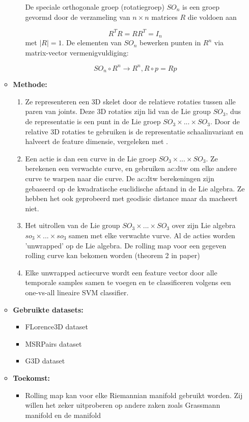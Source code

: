 \begin{itemize}
\begin{itemize}
\begin{itemize}
			De speciale orthogonale groep (rotatiegroep) $SO_n$ is een groep gevormd door de verzameling van $n \times n$ matrices $R$ die voldoen aan
			
			$$R^TR = RR^T = I_n$$
			met $|R| = 1$. De elementen van $SO_n$ bewerken punten in $R^n$ via matrix-vector vermenigvuldiging:
			
			$$SO_n \circ R^n \rightarrow R^n, R \circ p = Rp$$
		\end{itemize}
		\item \textbf{Methode:} 
		\begin{enumerate}
			\item Ze representeren een 3D skelet door de relatieve rotaties tussen alle paren van joints. Deze 3D rotaties zijn lid van de Lie group $SO_3$, dus de representatie is een punt in de Lie groep $SO_3 \times ... \times SO_3$. Door de relative 3D rotaties te gebruiken is de representatie schaalinvariant en halveert de feature dimensie, vergeleken met \cite{Vemulapalli2014}.
			\item Een actie is dan een curve in de Lie groep $SO_3 \times ... \times SO_3$. Ze berekenen een verwachte curve, en gebruiken \gls{ac:dtw} om elke andere curve te warpen naar die curve. De \gls{ac:dtw} berekeningen zijn gebaseerd op de kwadratische euclidische afstand in de Lie algebra. Ze hebben het ook geprobeerd met geodisic distance maar da macheert niet. 
			\item Het uitrollen van de Lie group $SO_3 \times ... \times SO_3$ over zijn Lie algebra $so_3 \times ... \times so_3$ samen met elke verwachte vurve. Al de acties worden 'unwrapped' op de Lie algebra. De rolling map voor een gegeven rolling curve kan bekomen worden (theorem 2 in paper)
			\item Elke unwrapped actiecurve wordt een feature vector door alle temporale samples samen te voegen en te classificeren volgens een one-vs-all lineaire SVM classifier.
		\end{enumerate}
		\item \textbf{Gebruikte datasets:}
		\begin{itemize}
			\item FLorence3D dataset
			\item MSRPairs dataset
			\item G3D dataset
		\end{itemize}
		\item \textbf{Toekomst:}
		\begin{itemize}
			\item Rolling map kan voor elke Riemannian manifold gebruikt worden. Zij willen het zeker uitproberen op andere zaken zoals Grassmann manifold en de manifold 

\end{itemize}
\end{itemize}
\end{itemize}
